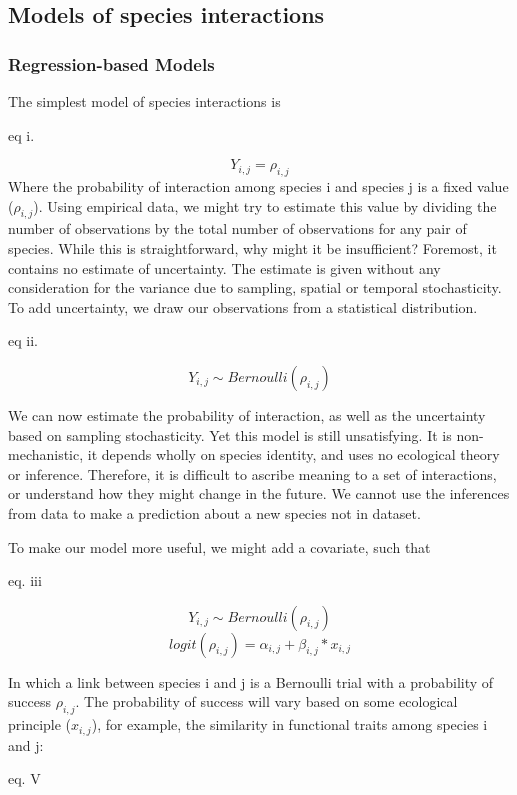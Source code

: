 \subsection{Models of species
interactions}\label{models-of-species-interactions}

\subsubsection{Regression-based Models}\label{regression-based-models}

The simplest model of species interactions is

eq i.

\[Y_{i,j} = \rho_{i,j}\] Where the probability of interaction among species i
and species j is a fixed value (\(\rho_{i,j}\)). Using empirical data, we might
try to estimate this value by dividing the number of observations by the total
number of observations for any pair of species. While this is straightforward,
why might it be insufficient? Foremost, it contains no estimate of uncertainty.
The estimate is given without any consideration for the variance due to
sampling, spatial or temporal stochasticity. To add uncertainty, we draw our
observations from a statistical distribution.

eq ii.

\[ Y_{i,j} \sim Bernoulli(\rho_{i,j}) \]

We can now estimate the probability of interaction, as well as the uncertainty
based on sampling stochasticity. Yet this model is still unsatisfying. It is
non-mechanistic, it depends wholly on species identity, and uses no ecological
theory or inference. Therefore, it is difficult to ascribe meaning to a set of
interactions, or understand how they might change in the future. We cannot use
the inferences from data to make a prediction about a new species not in
dataset.

To make our model more useful, we might add a covariate, such that

eq. iii

\[ Y_{i,j} \sim Bernoulli(\rho_{i,j})\] \[ logit(\rho_{i,j}) = \alpha_{i,j} +
\beta_{i,j} * x_{i,j} \]

In which a link between species i and j is a Bernoulli trial with a probability
of success \(\rho_{i,j}\). The probability of success will vary based on some
ecological principle (\(x_{i,j}\)), for example, the similarity in functional
traits among species i and j:

eq. V

